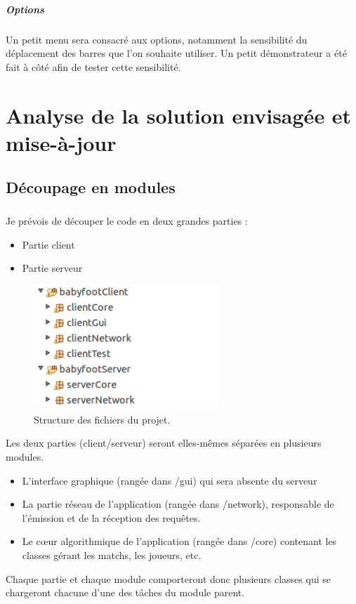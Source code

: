 \documentclass[a4paper,12pt]{report}
\begin{document}
\paragraph{Options}
Un petit menu sera consacré aux options, notamment la sensibilité du déplacement des barres que l'on souhaite utiliser. Un petit démonstrateur a été fait à côté afin de tester cette sensibilité.


\chapter{Analyse de la solution envisagée et mise-à-jour}


\section{Découpage en modules}
\paragraph{}
Je prévois de découper le code en deux grandes parties :
\begin{itemize}
    \item Partie client
    \item Partie serveur
\end{itemize}
\begin{figure}[H]
	\begin{center}
	\includegraphics[width=07cm]{pictures/structure.png} 
	\end{center}
	\caption{Structure des fichiers du projet.}
    \end{figure}
Les deux parties (client/serveur) seront elles-mêmes séparées en plusieurs modules.
\begin{itemize}
    \item L'interface graphique (rangée dans /gui) qui sera absente du serveur
    \item La partie réseau de l'application (rangée dans /network), responsable de l'émission et de la réception des requêtes.
    \item Le c\oe{}ur algorithmique de l'application (rangée dans /core) contenant les classes gérant les matchs, les joueurs, etc.
\end{itemize}
Chaque partie et chaque module comporteront donc plusieurs classes qui se chargeront chacune d'une des tâches du module parent.
\end{document}
